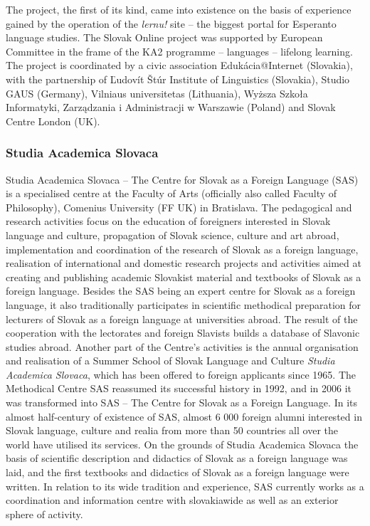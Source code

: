 \begin{multicols}{2}
The project, the first of its kind, came into existence on the basis of experience gained by the operation of the \emph{lernu!}\cite{f7} site – the biggest portal for Esperanto language studies. The Slovak Online project was supported by European Committee in the frame of the KA2 programme – languages – lifelong learning. The project is coordinated by a civic association Edukácia@Internet (Slovakia), with the partnership of Ľudovít Štúr Institute of Linguistics (Slovakia), Studio GAUS (Germany), Vilniaus universitetas (Lithuania), Wyższa Szkoła Informatyki, Zarządzania i Administracji w Warszawie (Poland) and Slovak Centre London (UK).

\subsubsection{Studia Academica Slovaca}
Studia Academica Slovaca – The Centre for Slovak as a Foreign Language (SAS) is a specialised centre at the Faculty of Arts (officially also called Faculty of Philosophy), Comenius University (FF UK) in Bratislava. The pedagogical and research activities focus on the education of foreigners interested in Slovak language and culture, propagation of Slovak science, culture and art abroad, implementation and coordination of the research of Slovak as a foreign language, realisation of international and domestic research projects and activities aimed at creating and publishing academic Slovakist material and textbooks of Slovak as a foreign language. Besides the SAS being an expert centre for Slovak as a foreign language, it also traditionally participates in scientific methodical preparation for lecturers of Slovak as a foreign language at universities abroad. The result of the cooperation with the lectorates and foreign Slavists builds a database of Slavonic studies abroad.
Another part of the Centre's activities is the annual organisation and realisation of a Summer School of Slovak Language and Culture \emph{Studia Academica Slovaca}, which has been offered to foreign applicants since 1965. The Methodical Centre SAS reassumed its successful history in 1992, and in 2006 it was transformed into SAS – The Centre for Slovak as a Foreign Language. In its almost half-century of existence of SAS, almost 6 000 foreign alumni interested in Slovak language, culture and realia from more than 50 countries all over the world have  utilised its services. On the grounds of Studia Academica Slovaca the basis of scientific description and didactics of Slovak as a foreign language was laid, and the first textbooks and didactics of Slovak as a foreign language were written. In relation to its wide tradition and experience, SAS currently works as a coordination and information centre with slovakiawide as well as an exterior sphere of activity.


\end{multicols}
